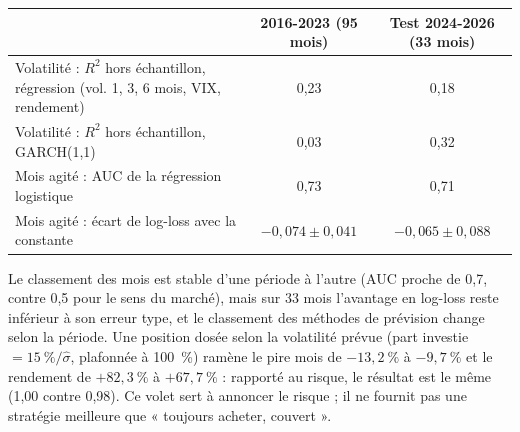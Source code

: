 \begin{table}[H]\centering\small
\begin{tabular}{p{8.2cm}cc}\toprule
 & 2016-2023 (95 mois) & Test 2024-2026 (33 mois) \\\midrule
Volatilité : $R^2$ hors échantillon, régression (vol. 1, 3, 6 mois, VIX, rendement) & 0,23 & 0,18 \\
Volatilité : $R^2$ hors échantillon, GARCH(1,1) & 0,03 & 0,32 \\
Mois agité : AUC de la régression logistique & 0,73 & 0,71 \\
Mois agité : écart de log-loss avec la constante & $-0{,}074 \pm 0{,}041$ & $-0{,}065 \pm 0{,}088$ \\\bottomrule
\end{tabular}\end{table}

Le classement des mois est stable d'une période à l'autre (AUC proche de 0,7, contre 0,5 pour le sens du marché),
mais sur 33 mois l'avantage en log-loss reste inférieur à son erreur type, et le classement des méthodes de
prévision change selon la période. Une position dosée selon la volatilité prévue (part investie $= 15~\%/\hat\sigma$,
plafonnée à 100~\%) ramène le pire mois de $-13{,}2~\%$ à $-9{,}7~\%$ et le rendement de $+82{,}3~\%$ à $+67{,}7~\%$ :
rapporté au risque, le résultat est le même (1,00 contre 0,98). Ce volet sert à annoncer le risque ; il ne fournit pas
une stratégie meilleure que « toujours acheter, couvert ».
